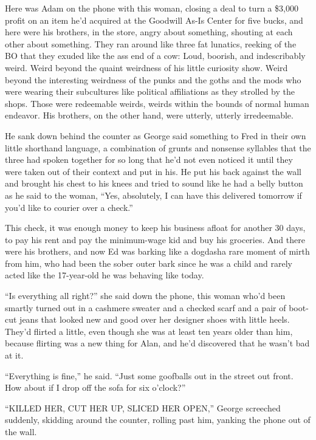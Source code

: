 Here was Adam on the phone with this woman, closing a deal to turn a
\$3,000 profit on an item he'd acquired at the Goodwill As-Is Center
for five bucks, and here were his brothers, in the store, angry about
something, shouting at each other about something.  They ran around
like three fat lunatics, reeking of the BO that they exuded like the
ass end of a cow:  Loud, boorish, and indescribably weird.  Weird
beyond the quaint weirdness of his little curiosity show.  Weird
beyond the interesting weirdness of the punks and the goths and the
mods who were wearing their subcultures like political affiliations as
they strolled by the shops.  Those were redeemable weirds, weirds
within the bounds of normal human endeavor.  His brothers, on the
other hand, were utterly, utterly irredeemable.

He sank down behind the counter as George said something to Fred in
their own little shorthand language, a combination of grunts and
nonsense syllables that the three had spoken together for so long that
he'd not even noticed it until they were taken out of their context
and put in his.  He put his back against the wall and brought his
chest to his knees and tried to sound like he had a belly button as he
said to the woman, ``Yes, absolutely, I can have this delivered
tomorrow if you'd like to courier over a check.''

This check, it was enough money to keep his business afloat for
another 30 days, to pay his rent and pay the minimum-wage kid and buy
his groceries.  And there were his brothers, and now Ed was barking
like a dogdash{}a rare moment of mirth from him, who had been the sober
outer bark since he was a child and rarely acted like the 17-year-old
he was behaving like today.

``Is everything all right?'' she said down the phone, this woman who'd
been smartly turned out in a cashmere sweater and a checked scarf and
a pair of boot-cut jeans that looked new and good over her designer
shoes with little heels.  They'd flirted a little, even though she was
at least ten years older than him, because flirting was a new thing
for Alan, and he'd discovered that he wasn't bad at it.

``Everything is fine,'' he said.  ``Just some goofballs out in the
street out front.  How about if I drop off the sofa for six o'clock?''

``KILLED HER, CUT HER UP, SLICED HER OPEN,'' George screeched
suddenly, skidding around the counter, rolling past him, yanking the
phone out of the wall.

